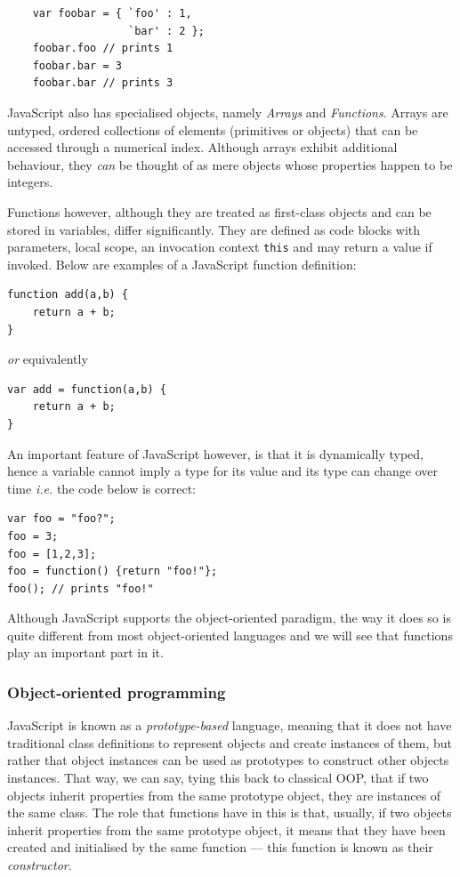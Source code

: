 \documentclass[a4paper,11pt,titlepage]{report}
\begin{document}
\begin{verbatim}
	var foobar = { `foo' : 1,
	               `bar' : 2 };
	foobar.foo // prints 1
	foobar.bar = 3
	foobar.bar // prints 3
\end{verbatim}

JavaScript also has specialised objects, namely \emph{Arrays} and \emph{Functions}. Arrays are untyped, ordered collections of elements (primitives or objects) that can be accessed through a numerical index. Although arrays exhibit additional behaviour, they \emph{can} be thought of as mere objects whose properties happen to be integers.

Functions however, although they are treated as first-class objects and can be stored in variables, differ significantly. They are defined as code blocks with parameters, local scope, an invocation context \texttt{this} and may return a value if invoked. Below are examples of a JavaScript function definition:

\begin{verbatim}
function add(a,b) {
    return a + b;
}
\end{verbatim}
\emph{or} equivalently
\begin{verbatim}
var add = function(a,b) {
    return a + b;
}
\end{verbatim}

An important feature of JavaScript however, is that it is dynamically typed, hence a variable cannot imply a type for its value and its type can change over time \emph{i.e.} the code below is correct:

\begin{verbatim}
var foo = "foo?";
foo = 3;
foo = [1,2,3];
foo = function() {return "foo!"};
foo(); // prints "foo!"
\end{verbatim}

Although JavaScript supports the object-oriented paradigm, the way it does so is quite different from most object-oriented languages and we will see that functions play an important part in it.

\subsubsection{Object-oriented programming}

JavaScript is known as a \emph{prototype-based} language, meaning that it does not have traditional class definitions to represent objects and create instances of them, but rather that object instances can be used as prototypes to construct other objects instances. That way, we can say, tying this back to classical OOP, that if two objects inherit properties from the same prototype object, they are instances of the same class. The role that functions have in this is that, usually, if two objects inherit properties from the same prototype object, it means that they have been created and initialised by the same function --- this function is known as their \emph{constructor}.
\end{document}

